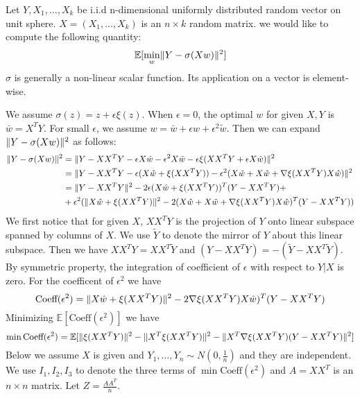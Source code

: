 \documentclass{article}
\DeclarePairedDelimiter\norm{\lVert}{\rVert}
\def\E{\mathbb{E}}
\begin{document}
Let $Y, X_1, \dots, X_k$ be i.i.d n-dimensional uniformly distributed random vector on unit sphere. $X=(X_1, \dots, X_k)$ is an $n\times k$ random matrix. we would like to compute the following quantity:
\begin{equation}
\E[\min_w \norm{Y - \sigma (X w ) }^2]
\end{equation}
$\sigma$ is generally a non-linear scalar function. Its application on a vector is element-wise.

We assume $\sigma(z) = z + \epsilon \xi(z)$. When $\epsilon = 0$, the optimal $w$ for given $X, Y$ is 
$\bar{w} = X^T Y $. For small $\epsilon$, we assume $ w = \bar{w} + \epsilon \hat{w} + \epsilon^2 \tilde{w}$. Then we can expand $\norm{Y - \sigma (X w ) }^2$ as follows:
\begin{align*}
\norm{Y - \sigma (X w ) }^2 & = \norm{Y - XX^T Y - \epsilon X \hat{w} - \epsilon^2 X \tilde{w} - \epsilon \xi(XX^T Y + \epsilon X\hat{w}) }^2 \\
& = \norm{ Y - XX^T Y - \epsilon (X\hat{w} + \xi(XX^T Y)) - \epsilon^2(X\tilde{w} + X\hat{w} + \nabla \xi(XX^TY)X\hat{w})}^2 \\
& = \norm{Y-XX^T Y }^2 - 2 \epsilon (X \hat{w} + \xi(XX^TY))^T (Y-XX^TY) +\\
& +\epsilon^2(\norm{X\hat{w} + \xi(XX^TY)}^2 - 2 (X\hat{w} + X \tilde{w}+ \nabla \xi(XX^TY)X\hat{w})^T(Y-XX^TY))
\end{align*}
We first notice that for given $X$, $XX^TY$ is the projection of $Y$ onto linear subspace spanned by columns of $X$. We use $\tilde{Y}$ to denote the mirror of $Y$ about this linear subspace. Then we have
$XX^T Y = XX^T \tilde{Y}$ and $(Y- XX^TY) = -(\tilde{Y} - XX^T \tilde{Y})$. By symmetric property, the integration of coefficient of $\epsilon$ with respect to $Y|X$ is zero. For the coefficent of $\epsilon^2$ we have
\begin{equation*}
\textrm{Coeff}(\epsilon^2)  =  \norm{X\hat{w} + \xi(XX^TY)}^2 - 2 \nabla \xi(XX^TY)X\hat{w})^T(Y-XX^TY)
\end{equation*}
Minimizing $\E[\textrm{Coeff}(\epsilon^2)]$ we have
\begin{equation}
\min \textrm{Coeff}(\epsilon^2) = \E[\norm{\xi(XX^TY)}^2 - \norm{X^T\xi(XX^TY)}^2 - \norm{X^T \nabla\xi(XX^TY)(Y-XX^TY)}^2]
\end{equation}
Below we assume $X$ is given and $Y_1, \dots, Y_n  \sim N(0, \frac{1}{n})$ and they are independent. We use $I_1, I_2, I_3$ to denote the three terms of $\min \textrm{Coeff}(\epsilon^2)$ and $A=XX^T$ is an $n\times n$ matrix. Let $Z = \frac{AA^T}{n}$.
\end{document}
